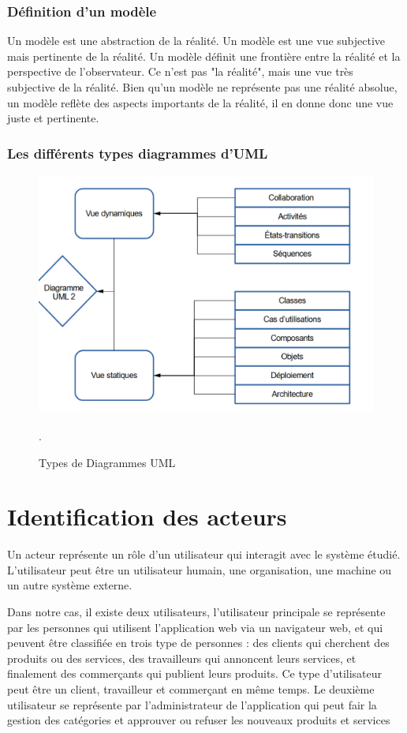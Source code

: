 \subsubsection{Définition d’un modèle }
\par Un modèle est une abstraction de la réalité. Un modèle est une vue subjective mais pertinente de la réalité. Un modèle définit une frontière entre la réalité et la perspective de l'observateur. Ce n'est pas "la réalité", mais une vue très subjective de la réalité. Bien qu'un modèle ne représente pas une réalité absolue, un modèle reflète des aspects importants de la réalité, il en donne donc une vue juste et pertinente.
\subsubsection{Les différents types diagrammes d’UML}
\begin{figure}[H]
    \centering
    \includegraphics[height=8cm]{Figures/TypeDiagrammesUML.png}
    \caption{Types de Diagrammes UML \cite{ref3}}.
    \label{fig:my_label}
\end{figure}
\section{Identification des acteurs }
\par Un acteur représente un rôle d'un utilisateur qui interagit avec le système étudié. L'utilisateur peut être un utilisateur humain, une organisation, une machine ou un autre système externe.\cite{ref4}
\par Dans notre cas, il existe deux utilisateurs, l’utilisateur principale se représente par les personnes qui utilisent l’application web via un navigateur web, et qui peuvent être classifiée en trois type de personnes : des clients qui cherchent des produits ou des services, des travailleurs qui annoncent leurs services, et finalement des commerçants qui publient leurs produits. Ce type d’utilisateur peut être un client, travailleur et commerçant en même temps. Le deuxième utilisateur se représente par l’administrateur de l’application qui peut fair la gestion des catégories et approuver ou refuser les nouveaux produits et services
